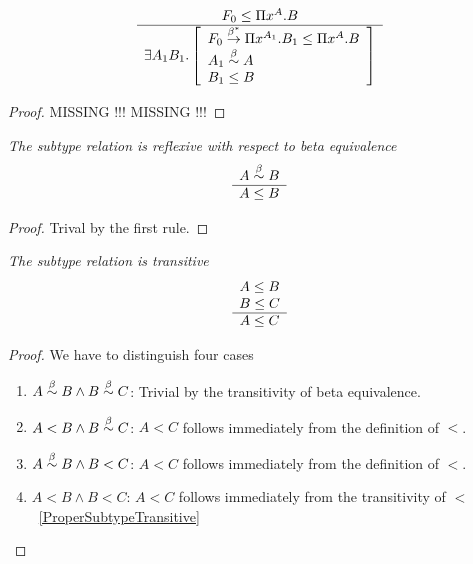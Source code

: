 \begin{theorem}
    \label{SubtypeProduct3}
    $$
    \begin{array}{c} 
        F_0 \le \Pi x^A. B
     \\ \hline 
        \exists A_1 B_1.
        \left[
        \begin{array}{l}
            F_0 \stackrel{\beta^*}{\to} \Pi x^{A_1}.B_1 \le \Pi x^A. B
            \\
            A_1 \stackrel{\beta}{\sim} A
            \\
            B_1 \le B
        \end{array}
        \right]
    \end{array}
    $$

    \begin{proof}
        MISSING !!! MISSING !!!
    \end{proof}
\end{theorem}



\begin{theorem}
    \emph{The subtype relation is reflexive with respect to beta equivalence}
    $$
    \begin{array}{c} 
        A \stackrel{\beta}{\sim} B
     \\ \hline 
        A \le B
    \end{array}
    $$
    \begin{proof} Trival by the first rule.
    \end{proof}
\end{theorem}






\begin{theorem}
    \label{SubtypeTransitive}
    \emph{The subtype relation is transitive}
    $$
    \begin{array}{c} 
        A \le B
        \\
        B \le C
     \\ \hline 
        A \le C
    \end{array}
    $$
    \begin{proof}
        We have to distinguish four cases
        \begin{enumerate}
        \item $A \stackrel{\beta}{\sim} B \land B \stackrel{\beta}{\sim} C$: Trivial by the transitivity of
            beta equivalence.

        \item $A < B \land B \stackrel{\beta}{\sim} C$: $A < C$ follows immediately from the
            definition of $<$.

        \item $A \stackrel{\beta}{\sim} B \land B < C$: $A < C$ follows immediately from the
            definition of $<$.

        \item $A < B \land B < C$: $A < C$ follows immediately from the
            transitivity of $<$~\ref{ProperSubtypeTransitive}
        \end{enumerate}
    \end{proof}
\end{theorem}


